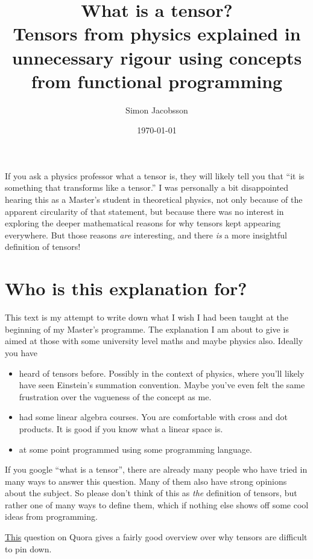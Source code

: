 \documentclass[english, 12pt]{article}
\title{What is a tensor?\\Tensors from physics explained in unnecessary rigour using concepts from functional programming\\\ding{166}}
\author{Simon Jacobsson}
\date{\today}
\begin{document}
 
\maketitle

If you ask a physics professor what a tensor is, they will likely tell you that \enquote{it is something that transforms like a tensor.}
I was personally a bit disappointed hearing this as a Master's student in theoretical physics, not only because of the apparent circularity of that statement, but because there was no interest in exploring the deeper mathematical reasons for why tensors kept appearing everywhere.
But those reasons \emph{are} interesting, and there \emph{is} a more insightful definition of tensors!

\section{Who is this explanation for?}%
\label{sec:who_is_this_explanation_for_}

This text is my attempt to write down what I wish I had been taught at the beginning of my Master's programme.
The explanation I am about to give is aimed at those with some university level maths and maybe physics also.
Ideally you have
\begin{itemize}
	\item heard of tensors before.
	Possibly in the context of physics, where you'll likely have seen Einstein's summation convention.
	Maybe you've even felt the same frustration over the vagueness of the concept as me.
	\item had some linear algebra courses.
	You are comfortable with cross and dot products.
	It is good if you know what a linear space is.
	\item at some point programmed using some programming language.
\end{itemize}

If you google \enquote{what is a tensor}, there are already many people who have tried in many ways to answer this question.
Many of them also have strong opinions about the subject.
So please don't think of this as \emph{the} definition of tensors, but rather one of many ways to define them, which if nothing else shows off some cool ideas from programming.

\href{https://www.quora.com/Why-is-it-difficult-to-explain-tensors?}{\color{blue}This} question on Quora gives a fairly good overview over why tensors are difficult to pin down.
\end{document}
